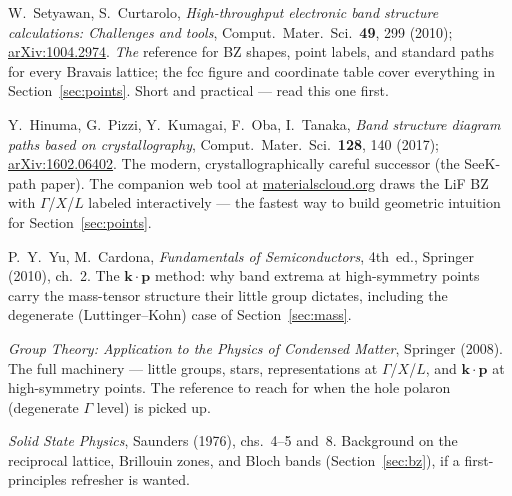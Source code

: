 \documentclass[11pt]{article}
\newcommand{\kv}{\mathbf{k}}
\newcommand{\pv}{\mathbf{p}}
\begin{document}
\begin{description}
\sloppy
\item[Setyawan \& Curtarolo (2010).] W.~Setyawan, S.~Curtarolo, \emph{High-throughput
  electronic band structure calculations: Challenges and tools}, Comput.\ Mater.\ Sci.\
  \textbf{49}, 299 (2010); \href{https://arxiv.org/abs/1004.2974}{arXiv:1004.2974}.
  \emph{The} reference for BZ shapes, point labels, and standard paths for every Bravais
  lattice; the fcc figure and coordinate table cover everything in
  Section~\ref{sec:points}. Short and practical --- read this one first.
\item[Hinuma et al.\ (2017).] Y.~Hinuma, G.~Pizzi, Y.~Kumagai, F.~Oba, I.~Tanaka,
  \emph{Band structure diagram paths based on crystallography}, Comput.\ Mater.\ Sci.\
  \textbf{128}, 140 (2017); \href{https://arxiv.org/abs/1602.06402}{arXiv:1602.06402}.
  The modern, crystallographically careful successor (the SeeK-path paper). The
  companion web tool at
  \href{https://www.materialscloud.org/work/tools/seekpath}{materialscloud.org} draws
  the LiF BZ with $\Gamma$/$X$/$L$ labeled interactively --- the fastest way to build
  geometric intuition for Section~\ref{sec:points}.
\item[Yu \& Cardona.] P.~Y.~Yu, M.~Cardona, \emph{Fundamentals of Semiconductors},
  4th~ed., Springer (2010), ch.~2. The $\kv\!\cdot\!\pv$ method: why band extrema at
  high-symmetry points carry the mass-tensor structure their little group dictates,
  including the degenerate (Luttinger--Kohn) case of Section~\ref{sec:mass}.
\item[Dresselhaus, Dresselhaus \& Jorio.] \emph{Group Theory: Application to the
  Physics of Condensed Matter}, Springer (2008). The full machinery --- little groups,
  stars, representations at $\Gamma$/$X$/$L$, and $\kv\!\cdot\!\pv$ at high-symmetry
  points. The reference to reach for when the hole polaron (degenerate $\Gamma$ level)
  is picked up.
\item[Ashcroft \& Mermin.] \emph{Solid State Physics}, Saunders (1976), chs.~4--5
  and~8. Background on the reciprocal lattice, Brillouin zones, and Bloch bands
  (Section~\ref{sec:bz}), if a first-principles refresher is wanted.
\end{description}
\end{document}
